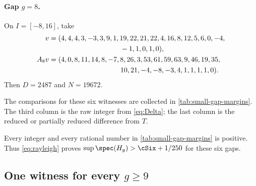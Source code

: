 \paragraph{Gap \(g=8\).}
On \(I=[-8,16]\), take
\begin{align*}
 v={}&(4,4,4,3,-3,3,9,1,19,22,21,22,4,16,8,12,5,6,0,-4,\\
 &\hspace{31mm}-1,1,0,1,0),\\
 A_8v={}&(4,0,8,11,14,8,-7,8,26,3,53,61,59,63,9,46,19,35,\\
 &\hspace{31mm}10,21,-4,-8,-3,4,1,1,1,1,0).
\end{align*}
Then \(D=2487\) and \(N=19672\).

The comparisons for these six witnesses are collected in
\cref{tab:small-gap-margins}.  The third column is the raw integer from
\eqref{eq:Delta}; the last column is the reduced or partially reduced
difference from \(T\).

\begin{table}[htbp]
\centering
\small
\caption{Small-gap Rayleigh comparisons.}
\label{tab:small-gap-margins}
\end{table}

Every integer and every rational number in \cref{tab:small-gap-margins} is
positive.  Thus \eqref{eq:rayleigh} proves
\(\sup\spec(H_g)>\cSix+1/250\) for these six gaps.

\subsection{One witness for every \texorpdfstring{\(g\geq9\)}{g at least 9}}


